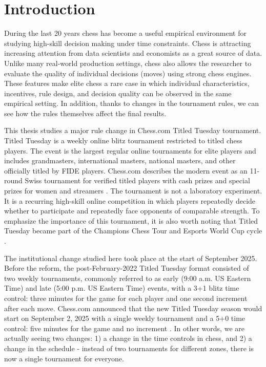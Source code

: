 \section{Introduction}

During the last 20 years chess has become a useful empirical environment for studying high-skill decision making under time constraints. Chess is attracting increasing attention from data scientists and economists as a great source of data. Unlike many real-world production settings, chess also allows the researcher to evaluate the quality of individual decisions (moves) using strong chess engines. These features make elite chess a rare case in which individual characteristics, incentives, rule design, and decision quality can be observed in the same empirical setting. In addition, thanks to changes in the tournament rules, we can see how the rules themselves affect the final results.

This thesis studies a major rule change in Chess.com Titled Tuesday tournament. Titled Tuesday is a weekly online blitz tournament restricted to titled chess players. The event is the largest regular online tournaments for elite players and includes grandmasters, international masters, national masters, and other officially titled by FIDE players. Chess.com describes the modern event as an 11-round Swiss tournament for verified titled players with cash prizes and special prizes for women and streamers \citep{chesscom_titled_tuesday}. The tournament is not a laboratory experiment. It is a recurring high-skill online competition in which players repeatedly decide whether to participate and repeatedly face opponents of comparable strength. To emphasize the importance of this tournament, it is also worth noting that Titled Tuesday became part of the Champions Chess Tour and Esports World Cup cycle \citep{chesscom_titled_tuesday}.

The institutional change studied here took place at the start of September 2025. Before the reform, the post-February-2022 Titled Tuesday format consisted of two weekly tournaments, commonly referred to as early (9:00 a.m. US Eastern Time) and late (5:00 p.m. US Eastern Time) events, with a 3+1 blitz time control: three minutes for the game for each player and one second increment after each move. Chess.com announced that the new Titled Tuesday season would start on September 2, 2025 with a single weekly tournament and a 5+0 time control: five minutes for the game and no increment \citep{chesscom_major_changes_2025}. In other words, we are actually seeing two changes: 1) a change in the time controls in chess, and 2) a change in the schedule - instead of two tournaments for different zones, there is now a single tournament for everyone.  


